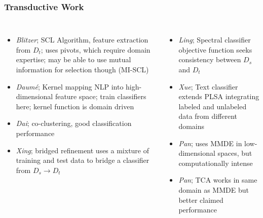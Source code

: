 \documentclass[t,handout]{beamer}
\begin{document}
\begin{frame}
\frametitle{Transductive Work}

\begin{columns}

\footnotesize{
\begin{itemize}
\item \textit{Blitzer}; SCL Algorithm, feature extraction from $D_{t}$; uses pivots, which require domain expertise; may be able to use mutual information for selection though (MI-SCL)
\item \textit{Daum\'{e}}; Kernel mapping NLP into high-dimensional feature space; train classifiers here; kernel function is domain driven
\item \textit{Dai}; co-clustering, good classification performance
\item \textit{Xing}; bridged refinement uses a mixture of training and test data to bridge a classifier from $D_{s} \rightarrow D_{t}$
\end{itemize}
}

\footnotesize{
\begin{itemize}
\item \textit{Ling}; Spectral classifier objective function seeks consistency between $D_{s}$ and $D_{t}$
\item \textit{Xue}; Text classifier extends PLSA integrating labeled and unlabeled data from different domains
\item \textit{Pan}; uses MMDE in low-dimensional spaces, but computationally intense 
\item \textit{Pan}; TCA works in same domain as MMDE but better claimed performance
\end{itemize}
}

\end{columns}

\end{frame}
\end{document}
